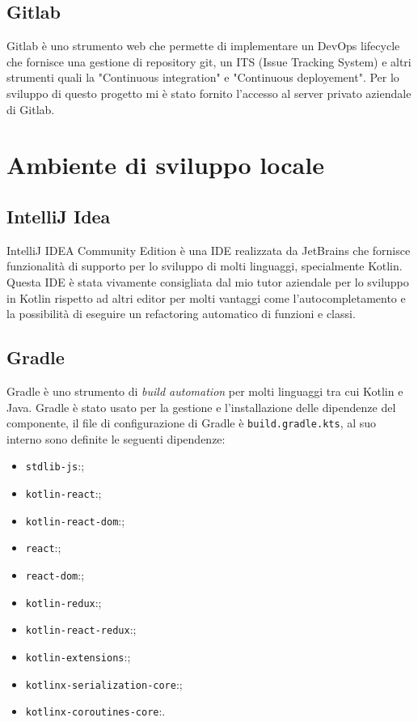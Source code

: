 \subsection{Gitlab}
Gitlab è uno strumento web che permette di implementare un DevOps lifecycle che fornisce una gestione di repository git, un ITS (Issue Tracking System) e altri strumenti quali la "Continuous integration" e "Continuous deployement". Per lo sviluppo di questo progetto mi è stato fornito l'accesso al server privato aziendale di Gitlab.

\section{Ambiente di sviluppo locale}
\subsection{IntelliJ Idea}
IntelliJ IDEA Community Edition è una IDE realizzata da JetBrains che fornisce funzionalità di supporto per lo sviluppo di molti linguaggi, specialmente Kotlin. Questa IDE è stata vivamente consigliata dal mio tutor aziendale per lo sviluppo in Kotlin rispetto ad altri editor per molti vantaggi come l'autocompletamento e la possibilità di eseguire un refactoring automatico di funzioni e classi.
 
\subsection{Gradle}
Gradle è uno strumento di \emph{build automation} per molti linguaggi tra cui Kotlin e Java. Gradle è stato usato per la gestione e l'installazione delle dipendenze del componente, il file di configurazione di Gradle è \verb|build.gradle.kts|, al suo interno sono definite le seguenti dipendenze:
\begin{itemize}
	\item \verb|stdlib-js|:;
	\item \verb|kotlin-react|:;
	\item \verb|kotlin-react-dom|:;
	\item \verb|react|:;
	\item \verb|react-dom|:;
	\item \verb|kotlin-redux|:;
	\item \verb|kotlin-react-redux|:;
	\item \verb|kotlin-extensions|:;
	\item \verb|kotlinx-serialization-core|:;
	\item \verb|kotlinx-coroutines-core|:.
\end{itemize}

